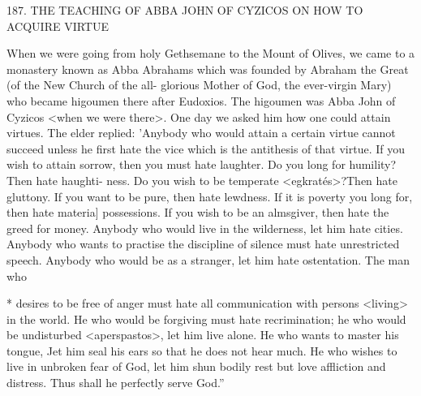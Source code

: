 187.
THE TEACHING OF ABBA JOHN OF CYZICOS
ON HOW TO ACQUIRE VIRTUE

When we were going from holy Gethsemane to the Mount of
Olives, we came to a monastery known as Abba Abraham\textquotesingle s which
was founded by Abraham the Great (of the New Church of the all-
glorious Mother of God, the ever-virgin Mary) who became
higoumen there after Eudoxios.
The higoumen was Abba John of
Cyzicos <when we were there>.
One day we asked him how one
could attain virtues.
The elder replied: 'Anybody who would attain
a certain virtue cannot succeed unless he first hate the vice which is
the antithesis of that virtue.
If you wish to attain sorrow, then you
must hate laughter.
Do you long for humility? Then hate haughti-
ness.
Do you wish to be temperate <egkratés>?Then hate gluttony.
If you want to be pure, then hate lewdness.
If it is poverty you long
for, then hate materia] possessions.
If you wish to be an almsgiver,
then hate the greed for money.
Anybody who would live in the
wilderness, let him hate cities.
Anybody who wants to practise the
discipline of silence must hate unrestricted speech.
Anybody who
would be as a stranger, let him hate ostentation.
The man who

* desires to be free of anger must hate all communication with
persons <living> in the world.
He who would be forgiving must
hate recrimination; he who would be undisturbed <aperspastos>,
let him live alone.
He who wants to master his tongue, Jet him seal
his ears so that he does not hear much.
He who wishes to live in
unbroken fear of God, let him shun bodily rest but love affliction
and distress.
Thus shall he perfectly serve God.”

